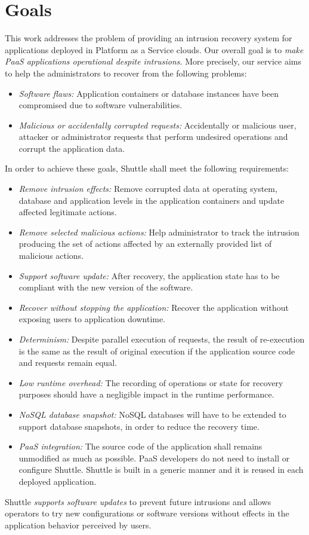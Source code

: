 \section{Goals}
\label{sec:Goals}
This work addresses the problem of providing an intrusion recovery system for applications deployed in Platform as a Service clouds. Our overall goal is to \textit{make PaaS applications operational despite intrusions}. More precisely, our service aims to help the administrators to recover from the following problems:
\begin{itemize}
  \item \textit{Software flaws:} Application containers or database instances have been compromised due to software vulnerabilities.
  \item \textit{Malicious or accidentally corrupted requests:} Accidentally or malicious user, attacker or administrator requests that perform undesired operations and corrupt the application data.
\end{itemize} 

In order to achieve these goals, Shuttle shall meet the following requirements: 
\begin{itemize}
  \item \textit{Remove intrusion effects:} Remove corrupted data at operating system, database and application levels in the application containers and update affected legitimate actions.
  \item \textit{Remove selected malicious actions:} Help administrator to track the intrusion producing the set of actions affected by an externally provided list of malicious actions.
  \item \textit{Support software update:} After recovery, the application state has to be compliant with the new version of the software.
  \item \textit{Recover without stopping the application:} Recover the application without exposing users to application downtime.
  \item \textit{Determinism:} Despite parallel execution of requests, the result of re-execution is the same as the result of original execution if the application source code and requests remain equal.
  \item \textit{Low runtime overhead:} The recording of operations or state for recovery purposes should have a negligible impact in the runtime performance.
  \item \textit{NoSQL database snapshot:} NoSQL databases will have to be extended to support database snapshots, in order to reduce the recovery time.
  \item \textit{PaaS integration:} The source code of the application shall remains unmodified as much as possible. PaaS developers do not need to install or configure Shuttle. Shuttle is built in a generic manner and it is reused in each deployed application.
\end{itemize}

Shuttle \textit{supports software updates} to prevent future intrusions and allows operators to try new configurations or software versions without effects in the application behavior perceived by users.
